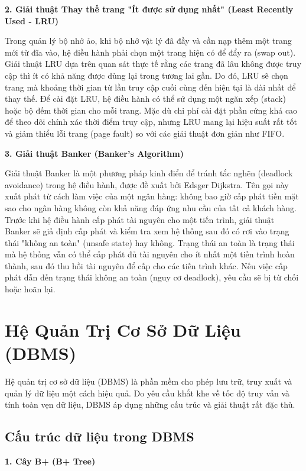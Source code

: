 \documentclass[a4paper,12pt]{article}
\begin{document}
\textbf{2. Giải thuật Thay thế trang "Ít được sử dụng nhất" (Least Recently Used - LRU)}

Trong quản lý bộ nhớ ảo, khi bộ nhớ vật lý đã đầy và cần nạp thêm một trang mới từ đĩa vào, hệ điều hành phải chọn một trang hiện có để đẩy ra (swap out). Giải thuật LRU dựa trên quan sát thực tế rằng các trang đã lâu không được truy cập thì ít có khả năng được dùng lại trong tương lai gần. Do đó, LRU sẽ chọn trang mà khoảng thời gian từ lần truy cập cuối cùng đến hiện tại là dài nhất để thay thế. Để cài đặt LRU, hệ điều hành có thể sử dụng một ngăn xếp (stack) hoặc bộ đếm thời gian cho mỗi trang. Mặc dù chi phí cài đặt phần cứng khá cao để theo dõi chính xác thời điểm truy cập, nhưng LRU mang lại hiệu suất rất tốt và giảm thiểu lỗi trang (page fault) so với các giải thuật đơn giản như FIFO.

\textbf{3. Giải thuật Banker (Banker's Algorithm)}

Giải thuật Banker là một phương pháp kinh điển để tránh tắc nghẽn (deadlock avoidance) trong hệ điều hành, được đề xuất bởi Edsger Dijkstra. Tên gọi này xuất phát từ cách làm việc của một ngân hàng: không bao giờ cấp phát tiền mặt sao cho ngân hàng không còn khả năng đáp ứng nhu cầu của tất cả khách hàng. Trước khi hệ điều hành cấp phát tài nguyên cho một tiến trình, giải thuật Banker sẽ giả định cấp phát và kiểm tra xem hệ thống sau đó có rơi vào trạng thái "không an toàn" (unsafe state) hay không. Trạng thái an toàn là trạng thái mà hệ thống vẫn có thể cấp phát đủ tài nguyên cho ít nhất một tiến trình hoàn thành, sau đó thu hồi tài nguyên để cấp cho các tiến trình khác. Nếu việc cấp phát dẫn đến trạng thái không an toàn (nguy cơ deadlock), yêu cầu sẽ bị từ chối hoặc hoãn lại.

\section{Hệ Quản Trị Cơ Sở Dữ Liệu (DBMS)}

Hệ quản trị cơ sở dữ liệu (DBMS) là phần mềm cho phép lưu trữ, truy xuất và quản lý dữ liệu một cách hiệu quả. Do yêu cầu khắt khe về tốc độ truy vấn và tính toàn vẹn dữ liệu, DBMS áp dụng những cấu trúc và giải thuật rất đặc thù.

\subsection{Cấu trúc dữ liệu trong DBMS}

\textbf{1. Cây B+ (B+ Tree)}
\end{document}
